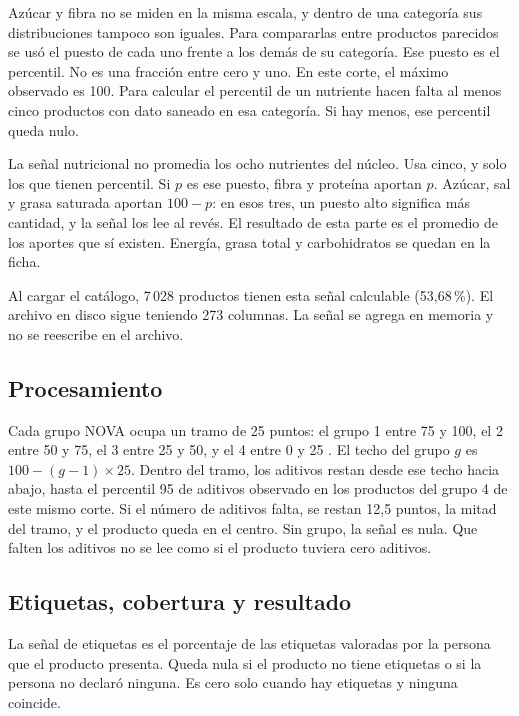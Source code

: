 Azúcar y fibra no se miden en la misma escala, y dentro de una categoría sus distribuciones tampoco son iguales. Para compararlas entre productos parecidos se usó el puesto de cada uno frente a los demás de su categoría. Ese puesto es el percentil. No es una fracción entre cero y uno. En este corte, el máximo observado es 100. Para calcular el percentil de un nutriente hacen falta al menos cinco productos con dato saneado en esa categoría. Si hay menos, ese percentil queda nulo.

La señal nutricional no promedia los ocho nutrientes del núcleo. Usa cinco, y solo los que tienen percentil. Si \(p\) es ese puesto, fibra y proteína aportan \(p\). Azúcar, sal y grasa saturada aportan \(100 - p\): en esos tres, un puesto alto significa más cantidad, y la señal los lee al revés. El resultado de esta parte es el promedio de los aportes que sí existen. Energía, grasa total y carbohidratos se quedan en la ficha.

Al cargar el catálogo, 7\,028 productos tienen esta señal calculable (53{,}68\,\%). El archivo en disco sigue teniendo 273 columnas. La señal se agrega en memoria y no se reescribe en el archivo.

\subsection{Procesamiento}

Cada grupo NOVA ocupa un tramo de 25 puntos: el grupo 1 entre 75 y 100, el 2 entre 50 y 75, el 3 entre 25 y 50, y el 4 entre 0 y 25 \citep{monteiro2018nova}. El techo del grupo \(g\) es \(100 - (g - 1) \times 25\). Dentro del tramo, los aditivos restan desde ese techo hacia abajo, hasta el percentil 95 de aditivos observado en los productos del grupo 4 de este mismo corte. Si el número de aditivos falta, se restan 12{,}5 puntos, la mitad del tramo, y el producto queda en el centro. Sin grupo, la señal es nula. Que falten los aditivos no se lee como si el producto tuviera cero aditivos.

\subsection{Etiquetas, cobertura y resultado}

La señal de etiquetas es el porcentaje de las etiquetas valoradas por la persona que el producto presenta. Queda nula si el producto no tiene etiquetas o si la persona no declaró ninguna. Es cero solo cuando hay etiquetas y ninguna coincide.

